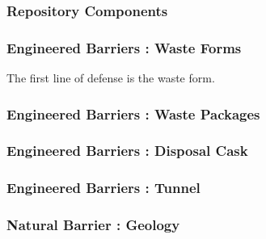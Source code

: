 

\begin{frame}
  \frametitle{Repository Components}
\footnotesize{
  
}
\end{frame}

\begin{frame}
  \frametitle{Engineered Barriers : Waste Forms}
\footnotesize{
  The first line of defense is the waste form.
  
}
\end{frame}

\begin{frame}
  \frametitle{Engineered Barriers : Waste Packages}
\footnotesize{
  
}
\end{frame}

\begin{frame}
  \frametitle{Engineered Barriers : Disposal Cask}
\footnotesize{
  
}
\end{frame}

\begin{frame}
  \frametitle{Engineered Barriers : Tunnel}
\footnotesize{
  
}
\end{frame}

\begin{frame}
  \frametitle{Natural Barrier : Geology}
\footnotesize{
  
}
\end{frame}

